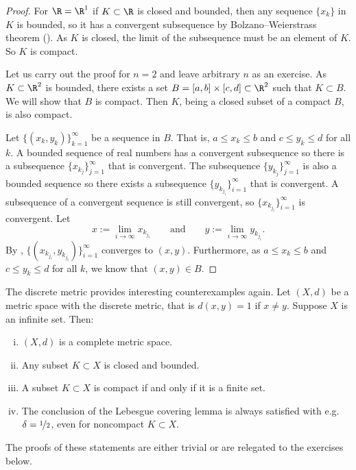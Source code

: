 \documentclass[12pt]{book}
\begin{document}
\begin{proof}
For $\R = \R^1$ if $K \subset \R$ is closed and bounded, then
any sequence $\{ x_k \}$ in $K$ is bounded, so it has a convergent
subsequence by
Bolzano--Weierstrass theorem ().
As $K$ is closed, the limit of the subsequence must be an element of
$K$.
So $K$ is compact.

Let us carry out the proof for $n=2$ and leave arbitrary $n$ as an exercise.
As $K \subset \R^2$ is bounded, there exists a set
$B=[a,b]\times[c,d] \subset \R^2$ such that $K \subset B$.
We will show
that $B$ is compact.
Then $K$, being a closed subset of a compact $B$, is
also compact.


Let $\{ (x_k,y_k) \}_{k=1}^\infty$ be a sequence in $B$.
That is,
$a \leq x_k \leq b$ and
$c \leq y_k \leq d$ for all $k$.
A bounded sequence of real numbers
has a convergent
subsequence so there is a subsequence $\{ x_{k_j} \}_{j=1}^\infty$
that is convergent.
The subsequence 
$\{ y_{k_j} \}_{j=1}^\infty$ is also a bounded sequence so there exists
a subsequence
$\{ y_{k_{j_i}} \}_{i=1}^\infty$ that is convergent.
A subsequence of a
convergent sequence is still convergent, so 
$\{ x_{k_{j_i}} \}_{i=1}^\infty$ is convergent.
Let
\begin{equation*}
x := \lim_{i\to\infty} x_{k_{j_i}}
\qquad \text{and} \qquad
y := \lim_{i\to\infty} y_{k_{j_i}} .
\end{equation*}
By ,
$\bigl\{ (x_{k_{j_i}},y_{k_{j_i}}) \bigr\}_{i=1}^\infty$ converges to $(x,y)$.
Furthermore, as $a \leq x_k \leq b$ and
$c \leq y_k \leq d$ for all $k$, we know that $(x,y) \in B$.
\end{proof}

\begin{example}
The discrete metric provides interesting counterexamples again.
Let $(X,d)$ be a metric space with the discrete metric, that is $d(x,y) = 1$
if $x \not= y$.
Suppose
$X$ is an infinite set.
Then:
\begin{enumerate}[(i)]
\item $(X,d)$ is a complete metric space.
\item Any subset $K \subset X$ is closed and bounded.
\item A subset $K \subset X$ is compact if and only if it is a finite set.
\item The conclusion of the Lebesgue covering lemma is always satisfied with
e.g. $\delta = \nicefrac{1}{2}$, even for noncompact $K \subset X$.
\end{enumerate}
The proofs
of these statements are either trivial or are relegated to the exercises
below.
\end{example}
\end{document}
